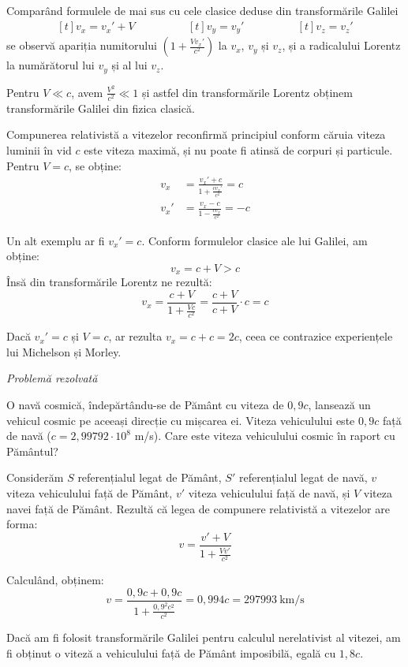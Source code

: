Comparând formulele de mai sus cu cele clasice deduse din transformările
Galilei
\begin{equation*}
    \begin{aligned}[t]
        v_x = v_x' + V
    \end{aligned}\qquad\qquad
    \begin{aligned}[t]
        v_y = v_y'
    \end{aligned}\qquad\qquad
    \begin{aligned}[t]
        v_z = v_z'
    \end{aligned}
\end{equation*}
se observă apariția numitorului \( \left( 1 + \frac{Vv_x'}{c^2} \right) \) la
$v_x$, $v_y$ și $v_z$, și a radicalului Lorentz la numărătorul lui $v_y$ și al
lui $v_z$.

Pentru \( V \ll c \), avem \( \frac{V^2}{c^2} \ll 1 \) și astfel din
transformările Lorentz obținem transformările Galilei din fizica clasică.

Compunerea relativistă a vitezelor reconfirmă principiul conform căruia viteza
luminii în vid $c$ este viteza maximă, și nu poate fi atinsă de corpuri și
particule. Pentru \( V = c \), se obține:
\begin{equation*}
    \begin{aligned}
        v_x &= \frac{v_x' + c}{1 + \frac{cv_x'}{c^2}} = c \\
        v_x' &= \frac{v_x - c}{1 - \frac{cv_x}{c^2}} = -c
    \end{aligned}
\end{equation*}

Un alt exemplu ar fi \( v_x' = c \). Conform formulelor clasice ale lui Galilei, am obține:
\[ v_x = c + V > c \]
Însă din transformările Lorentz ne rezultă:
\[ v_x = \frac{c + V}{1 + \frac{Vc}{c^2}} = \frac{c + V}{c + V} \cdot c = c \]

Dacă \( v_x' = c \) și \( V = c \), ar rezulta \( v_x = c + c = 2c \), ceea ce
contrazice experiențele lui Michelson și Morley.

\pagebreak

{\Large\emph{Problemă rezolvată}}
\vspace{0.5cm}

O navă cosmică, îndepărtându-se de Pământ cu viteza de $0,9c$, lansează un
vehicul cosmic pe aceeași direcție cu mișcarea ei. Viteza vehiculului este
$0,9c$ față de navă ($c = 2,99792 \cdot 10^8$  m/s). Care este viteza
vehiculului cosmic în raport cu Pământul?

\parbreak

Considerăm $S$ referențialul legat de Pământ, $S'$ referențialul legat de navă,
$v$ viteza vehiculului față de Pământ, $v'$ viteza vehiculului față de navă, și
$V$ viteza navei față de Pământ. Rezultă că legea de compunere relativistă a
vitezelor are forma:
\[ v = \frac{v' + V}{1 + \frac{Vv'}{c^2}} \]

Calculând, obținem:
\[ v = \frac{0,9c + 0,9c}{1 + \frac{0,9^2 c^2}{c^2}} = 0,994c = 297993 ~ \mathrm{km/s} \]

Dacă am fi folosit transformările Galilei pentru calculul nerelativist al
vitezei, am fi obținut o viteză a vehiculului față de Pământ imposibilă, egală
cu $1,8c$.

